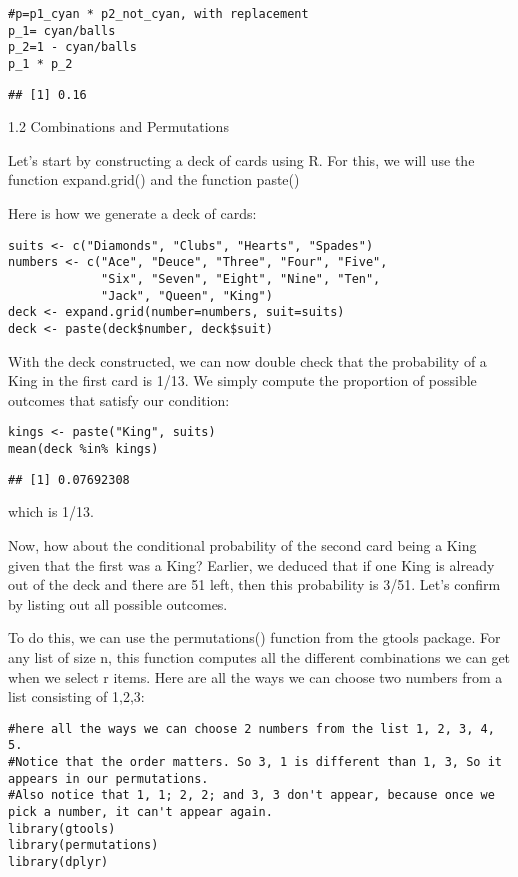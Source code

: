 \documentclass[
]{article}
\begin{document}
\begin{verbatim}
#p=p1_cyan * p2_not_cyan, with replacement
p_1= cyan/balls
p_2=1 - cyan/balls
p_1 * p_2
\end{verbatim}

\begin{verbatim}
## [1] 0.16
\end{verbatim}

1.2 Combinations and Permutations

Let's start by constructing a deck of cards using R. For this, we will
use the function expand.grid() and the function paste()

Here is how we generate a deck of cards:

\begin{verbatim}
suits <- c("Diamonds", "Clubs", "Hearts", "Spades")
numbers <- c("Ace", "Deuce", "Three", "Four", "Five", 
             "Six", "Seven", "Eight", "Nine", "Ten", 
             "Jack", "Queen", "King")
deck <- expand.grid(number=numbers, suit=suits)
deck <- paste(deck$number, deck$suit)
\end{verbatim}

With the deck constructed, we can now double check that the probability
of a King in the first card is 1/13. We simply compute the proportion of
possible outcomes that satisfy our condition:

\begin{verbatim}
kings <- paste("King", suits)
mean(deck %in% kings)
\end{verbatim}

\begin{verbatim}
## [1] 0.07692308
\end{verbatim}

which is 1/13.

Now, how about the conditional probability of the second card being a
King given that the first was a King? Earlier, we deduced that if one
King is already out of the deck and there are 51 left, then this
probability is 3/51. Let's confirm by listing out all possible outcomes.

To do this, we can use the permutations() function from the gtools
package. For any list of size n, this function computes all the
different combinations we can get when we select r items. Here are all
the ways we can choose two numbers from a list consisting of 1,2,3:

\begin{verbatim}
#here all the ways we can choose 2 numbers from the list 1, 2, 3, 4, 5.
#Notice that the order matters. So 3, 1 is different than 1, 3, So it appears in our permutations.
#Also notice that 1, 1; 2, 2; and 3, 3 don't appear, because once we pick a number, it can't appear again.
library(gtools)
library(permutations)
library(dplyr)
\end{verbatim}
\end{document}
